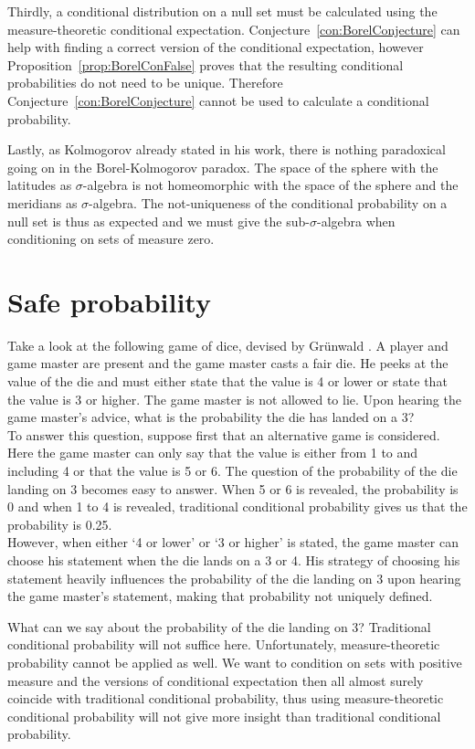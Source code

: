 \documentclass[a4paper]{report}
\theoremstyle{plain}
\theoremstyle{definition}
\theoremstyle{remark}
\numberwithin{equation}{chapter}
\DeclareMathOperator{\1}{\mathbbm{1}}
\begin{document}
Thirdly, a conditional distribution on a null set must be calculated using the measure-theoretic conditional expectation. Conjecture~\ref{con:BorelConjecture} can help with finding a correct version of the conditional expectation, however Proposition~\ref{prop:BorelConFalse} proves that the resulting conditional probabilities do not need to be unique. Therefore Conjecture~\ref{con:BorelConjecture} cannot be used to calculate a conditional probability.

Lastly, as Kolmogorov \cite{Kolmogorov33} already stated in his work, there is nothing paradoxical going on in the Borel-Kolmogorov paradox. The space of the sphere with the latitudes as $\sigma$-algebra is not homeomorphic with the space of the sphere and the meridians as $\sigma$-algebra. The not-uniqueness of the conditional probability on a null set is thus as expected and we must give the sub-$\sigma$-algebra when conditioning on sets of measure zero.


\chapter{Safe probability}\label{chap:SafeProp}
Take a look at the following game of dice, devised by Grünwald \cite{Grunwald13}. A player and game master are present and the game master casts a fair die. He peeks at the value of the die and must either state that the value is 4 or lower or state that the value is 3 or higher. The game master is not allowed to lie. Upon hearing the game master's advice, what is the probability the die has landed on a 3?\\
To answer this question, suppose first that an alternative game is considered. Here the game master can only say that the value is either from 1 to and including 4 or that the value is 5 or 6. The question of the probability of the die landing on 3 becomes easy to answer. When 5 or 6 is revealed, the probability is 0 and when 1 to 4 is revealed, traditional conditional probability gives us that the probability is 0.25.\\
However, when either `4 or lower' or `3 or higher' is stated, the game master can choose his statement when the die lands on a 3 or 4. His strategy of choosing his statement heavily influences the probability of the die landing on 3 upon hearing the game master's statement, making that probability not uniquely defined.

What can we say about the probability of the die landing on 3? Traditional conditional probability will not suffice here. Unfortunately, measure-theoretic probability cannot be applied as well. We want to condition on sets with positive measure and the versions of conditional expectation then all almost surely coincide with traditional conditional probability, thus using measure-theoretic conditional probability will not give more insight than traditional conditional probability.
\end{document}
